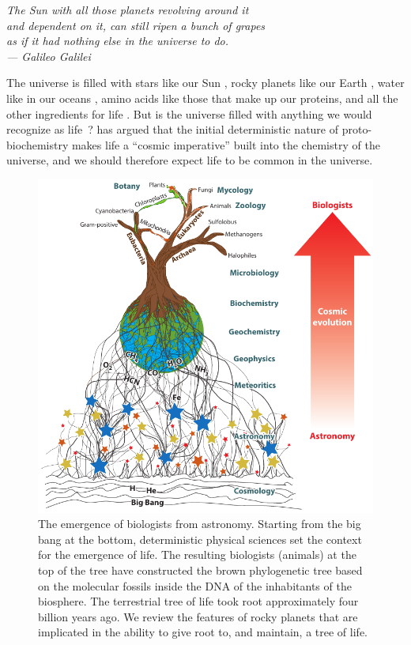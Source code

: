 \clearpage

\begin{flushright}
		\textit{The Sun with all those planets revolving around it\\ and dependent on it, can still ripen a bunch of grapes\\ as if it had nothing else in the universe to do. \\
		--- Galileo Galilei}
	\end{flushright}

The universe is filled with stars like our Sun \cite{Robles2008}, rocky planets like our Earth \citep{Howard2012}, water like in our oceans \citep{Mottl2007}, amino acids like those that make up our proteins, and all the other ingredients for life \citep{Pizzarello2007}. But is the universe filled with anything we would recognize as life \citep{Lineweaver2006}\,? \citet{DeDuve1995} has argued that the initial deterministic nature of proto-biochemistry makes life a ``cosmic imperative'' built into the chemistry of the universe, and we should therefore expect life to be common in the universe.

\begin{figure}[!hbt]
	\centering
	\includegraphics[width=1\linewidth]{figures/AnnRevs/AR1.pdf}
	\caption[Cosmic Evolution]{The emergence of biologists from astronomy. Starting from the big bang at the bottom, deterministic physical sciences set the context for the emergence of life. The resulting biologists (animals) at the top of the tree \citep[\eg][]{Pace1997, Hedges2009} have constructed the brown phylogenetic tree based on the molecular fossils inside the DNA of the inhabitants of the biosphere. The terrestrial tree of life took root approximately four billion years ago. We review the features of rocky planets that are implicated in the ability to give root to, and maintain, a tree of life. 
	}
	\label{fig:AR1}
\end{figure}

